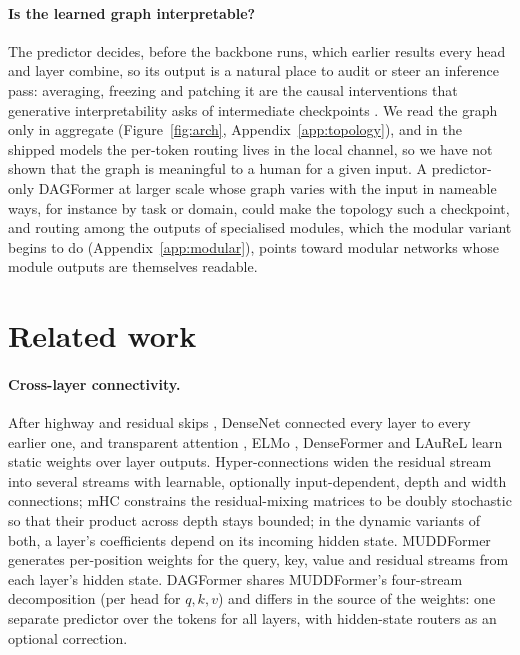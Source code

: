 \documentclass[11pt]{article}
\newcommand{\dagf}{DAGFormer}
\begin{document}
\paragraph{Is the learned graph interpretable?} The predictor decides, before the backbone runs, which earlier results every head and layer combine, so its output is a natural place to audit or steer an inference pass: averaging, freezing and patching it are the causal interventions that generative interpretability asks of intermediate checkpoints \citep{yang2026generative}. We read the graph only in aggregate (Figure~\ref{fig:arch}, Appendix~\ref{app:topology}), and in the shipped models the per-token routing lives in the local channel, so we have not shown that the graph is meaningful to a human for a given input. A predictor-only \dagf{} at larger scale whose graph varies with the input in nameable ways, for instance by task or domain, could make the topology such a checkpoint, and routing among the outputs of specialised modules, which the modular variant begins to do (Appendix~\ref{app:modular}), points toward modular networks whose module outputs are themselves readable.

\section{Related work}
\label{sec:related}

\paragraph{Cross-layer connectivity.} After highway and residual skips \citep{srivastava2015highway,he2016resnet}, DenseNet \citep{huang2017densenet} connected every layer to every earlier one, and transparent attention \citep{bapna2018transparent}, ELMo \citep{peters2018elmo}, DenseFormer \citep{pagliardini2024denseformer} and LAuReL \citep{menghani2024laurel} learn static weights over layer outputs. Hyper-connections \citep{zhu2024hyperconnections} widen the residual stream into several streams with learnable, optionally input-dependent, depth and width connections; mHC \citep{mhc2026} constrains the residual-mixing matrices to be doubly stochastic so that their product across depth stays bounded; in the dynamic variants of both, a layer's coefficients depend on its incoming hidden state. MUDDFormer \citep{muddformer2025} generates per-position weights for the query, key, value and residual streams from each layer's hidden state. \dagf{} shares MUDDFormer's four-stream decomposition (per head for $q,k,v$) and differs in the source of the weights: one separate predictor over the tokens for all layers, with hidden-state routers as an optional correction.
\end{document}
